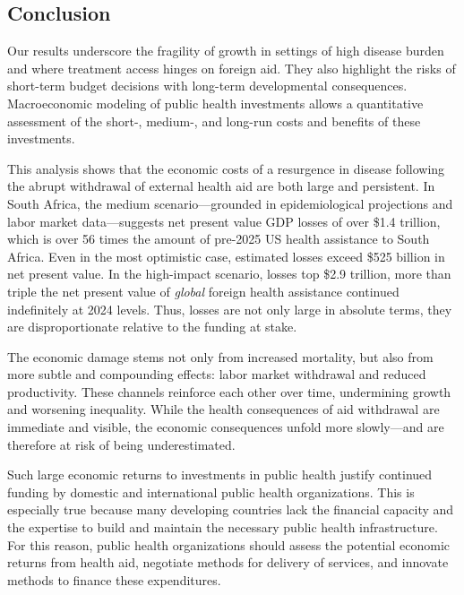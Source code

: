 \documentclass[letterpaper,12pt]{article}
\theoremstyle{definition}
\begin{document}
\begin{spacing}{1.5}
\section{Conclusion}\label{SecConc}

Our results underscore the fragility of growth in settings of high disease burden and where treatment access hinges on foreign aid. They also highlight the risks of short-term budget decisions with long-term developmental consequences. Macroeconomic modeling of public health investments allows a quantitative assessment of the short-, medium-, and long-run costs and benefits of these investments.

This analysis shows that the economic costs of a resurgence in disease following the abrupt withdrawal of external health aid are both large and persistent. In South Africa, the medium scenario---grounded in epidemiological projections and labor market data---suggests net present value GDP losses of over \$\num{1.4} trillion, which is over 56 times the amount of pre-2025 US health assistance to South Africa. Even in the most optimistic case, estimated losses exceed \$525 billion in net present value. In the high-impact scenario, losses top \$\num{2.9} trillion, more than triple the net present value of \emph{global} foreign health assistance continued indefinitely at 2024 levels. Thus, losses are not only large in absolute terms, they are disproportionate relative to the funding at stake.

The economic damage stems not only from increased mortality, but also from more subtle and compounding effects: labor market withdrawal and reduced productivity.  These channels reinforce each other over time, undermining growth and worsening inequality. While the health consequences of aid withdrawal are immediate and visible, the economic consequences unfold more slowly—and are therefore at risk of being underestimated.

Such large economic returns to investments in public health justify continued funding by domestic and international public health organizations. This is especially true because many developing countries lack the financial capacity and the expertise to build and maintain the necessary public health infrastructure. For this reason, public health organizations should assess the potential economic returns from health aid, negotiate methods for delivery of services, and innovate methods to finance these expenditures.

\end{spacing}
\end{document}
